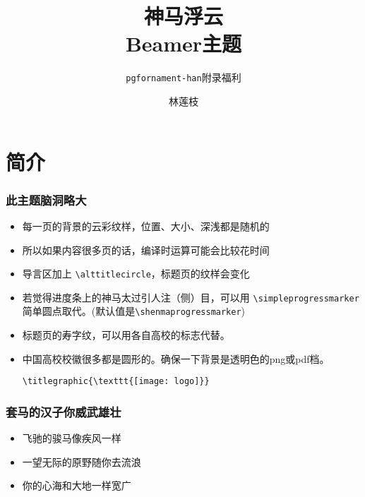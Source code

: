 \documentclass[aspectratio=1610,linespread=1.2]{ctexbeamer}
\author{林莲枝}
\title{神马浮云\\Beamer主题}
\subtitle{\texttt{pgfornament-han}附录福利}
\begin{document}
\begin{frame}[noframenumbering]
  \maketitle
\end{frame}

\section{简介}

\begin{frame}
  \frametitle{此主题脑洞略大}

  \begin{itemize}
    \item 每一页的背景的云彩纹样，位置、大小、深浅都是随机的
    \item 所以如果内容很多页的话，编译时运算可能会比较花时间
    \item 导言区加上 \verb|\alttitlecircle|，标题页的纹样会变化
    \item 若觉得进度条上的神马太过引人注（侧）目，可以用 \verb|\simpleprogressmarker| 简单圆点取代。(默认值是\verb|\shenmaprogressmarker|)

    \framebreak
    \item 标题页的寿字纹，可以用各自高校的标志代替。
    \item 中国高校校徽很多都是圆形的。确保一下背景是透明色的png或pdf档。

    \verb|\titlegraphic{\texttt{[image: logo]}}|

  \end{itemize}

\end{frame}

\begin{frame}
  \frametitle{套马的汉子你威武雄壮}

  \begin{itemize}
    \item 飞驰的骏马像疾风一样
    \item 一望无际的原野随你去流浪
    \item 你的心海和大地一样宽广
  \end{itemize}

\end{frame}
\end{document}
